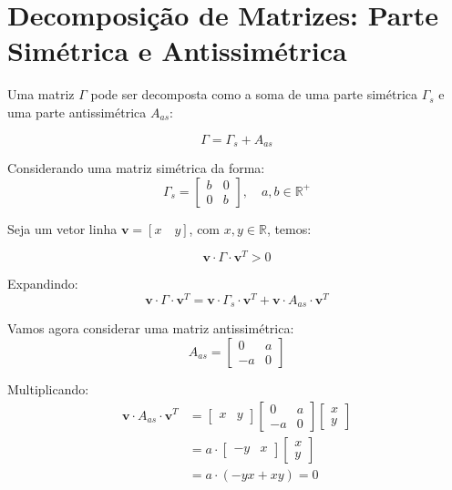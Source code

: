 \documentclass[10pt]{article}
\begin{document}
\newpage

\appendix
\section{Decomposição de Matrizes: Parte Simétrica e Antissimétrica}

Uma matriz $\Gamma$ pode ser decomposta como a soma de uma parte simétrica $\Gamma_s$ e uma parte antissimétrica $A_{as}$:

\begin{equation}
    \Gamma = \Gamma_s + A_{as}
\end{equation}

Considerando uma matriz simétrica da forma:
\begin{equation}
    \Gamma_s = 
    \begin{bmatrix}
        b & 0 \\
        0 & b
    \end{bmatrix}, \quad a, b \in \mathbb{R}^+
\end{equation}

Seja um vetor linha $\mathbf{v} = [x \quad y]$, com $x, y \in \mathbb{R}$, temos:

\begin{equation}
    \mathbf{v} \cdot \Gamma \cdot \mathbf{v}^T > 0
\end{equation}

Expandindo:
\begin{equation}
    \mathbf{v} \cdot \Gamma \cdot \mathbf{v}^T = 
    \mathbf{v} \cdot \Gamma_s \cdot \mathbf{v}^T + 
    \mathbf{v} \cdot A_{as} \cdot \mathbf{v}^T
\end{equation}

Vamos agora considerar uma matriz antissimétrica:
\begin{equation}
    A_{as} = 
    \begin{bmatrix}
        0 & a \\
        -a & 0
    \end{bmatrix}
\end{equation}

Multiplicando:
\begin{align}
    \mathbf{v} \cdot A_{as} \cdot \mathbf{v}^T &= 
    \begin{bmatrix}
        x & y
    \end{bmatrix}
    \begin{bmatrix}
        0 & a \\
        -a & 0
    \end{bmatrix}
    \begin{bmatrix}
        x \\
        y
    \end{bmatrix} \\
    &= a \cdot 
    \begin{bmatrix}
        -y & x
    \end{bmatrix}
    \begin{bmatrix}
        x \\
        y
    \end{bmatrix} \\
    &= a \cdot (-yx + xy) = 0
\end{align}
\end{document}
